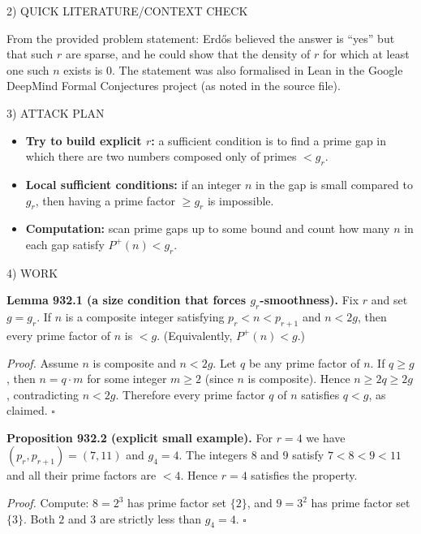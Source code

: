 2) QUICK LITERATURE/CONTEXT CHECK

From the provided problem statement: Erd\H{o}s believed the answer is ``yes'' but that such $r$ are sparse, and he could show that the density of $r$ for which at least one such $n$ exists is $0$. The statement was also formalised in Lean in the Google DeepMind Formal Conjectures project (as noted in the source file).

3) ATTACK PLAN

\begin{itemize}
\item \textbf{Try to build explicit $r$:} a sufficient condition is to find a prime gap in which there are two numbers composed only of primes $<g_r$.
\item \textbf{Local sufficient conditions:} if an integer $n$ in the gap is small compared to $g_r$, then having a prime factor $\ge g_r$ is impossible.
\item \textbf{Computation:} scan prime gaps up to some bound and count how many $n$ in each gap satisfy $P^+(n)<g_r$.
\end{itemize}

4) WORK

\textbf{Lemma 932.1 (a size condition that forces $g_r$-smoothness).}
Fix $r$ and set $g=g_r$.
If $n$ is a composite integer satisfying $p_r<n<p_{r+1}$ and $n<2g$, then every prime factor of $n$ is $<g$. (Equivalently, $P^+(n)<g$.)

\emph{Proof.}
Assume $n$ is composite and $n<2g$.
Let $q$ be any prime factor of $n$. If $q\ge g$, then $n=q\cdot m$ for some integer $m\ge 2$ (since $n$ is composite). Hence $n\ge 2q\ge 2g$, contradicting $n<2g$.
Therefore every prime factor $q$ of $n$ satisfies $q<g$, as claimed.
\hfill$\square$

\medskip
\textbf{Proposition 932.2 (explicit small example).}
For $r=4$ we have $(p_r,p_{r+1})=(7,11)$ and $g_4=4$. The integers $8$ and $9$ satisfy $7<8<9<11$ and all their prime factors are $<4$. Hence $r=4$ satisfies the property.

\emph{Proof.}
Compute: $8=2^3$ has prime factor set $\{2\}$, and $9=3^2$ has prime factor set $\{3\}$. Both $2$ and $3$ are strictly less than $g_4=4$.
\hfill$\square$

